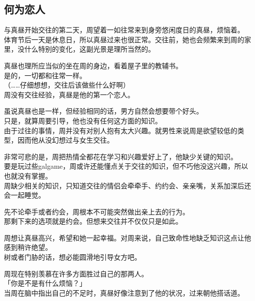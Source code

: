 \subsection{何为恋人}

与真昼开始交往的第二天，周望着一如往常来到身旁悠闲度日的真昼，烦恼着。\\

体育节后一天是休息日，所以真昼过来也很正常。交往前，她也会频繁来到周的家里，没什么特别的变化，这副光景是理所当然的。

真昼也理所应当似的坐在周的身边，看着屋子里的教辅书。\\

是的，一切都和往常一样。\\

（……仔细想想，交往后该做些什么好啊）\\

周没有交往经验，真昼是他的第一个恋人。

虽说真昼也是一样，但经验相同的话，男方自然会想要带个好头。\\

只是，就算周要引导，他也没有任何这方面的知识。\\

由于过往的事情，周并没有对别人抱有太大兴趣。就男性来说周是欲望较低的类型，因而他从没幻想过与女生交往。

非常可悲的是，周把热情全都花在学习和兴趣爱好上了，他缺少关键的知识。\\

要是玩过些galgame，周或许还能懂点关于交往的知识，但不巧他没这兴趣，所以也就没有掌握。\\

周缺少相关的知识，只知道交往的情侣会牵牵手、约约会、亲亲嘴，关系加深后还会一起睡觉。

先不论牵手或者约会，周根本不可能突然做出亲上去的行为。\\

那剩下来的选项就是约会。但想来交往并不仅仅只是如此。

周想让真昼高兴，希望和她一起幸福。对周来说，自己致命性地缺乏知识这点让他感到稍许绝望。\\

树或者门胁的话，想必能圆滑地引导女方吧。

周现在特别羡慕在许多方面胜过自己的那两人。\\

「你是不是有什么烦恼？」\\

当周在脑中指出自己的不足时，真昼好像注意到了他的状况，过来朝他搭话道。\\


